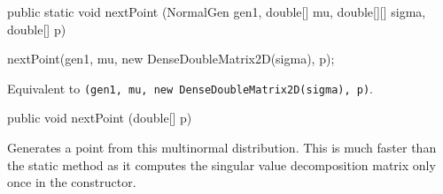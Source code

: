 \begin{code}

   public static void nextPoint (NormalGen gen1, double[] mu,
                                 double[][] sigma, double[] p)\begin{hide} {
      nextPoint(gen1, mu, new DenseDoubleMatrix2D(sigma), p);
   }\end{hide}
\end{code}
\begin{tabb}   Equivalent to
 \texttt{(gen1, mu, new DenseDoubleMatrix2D(sigma), p)}.
\end{tabb}
\begin{code}

   public void nextPoint (double[] p)\begin{hide} {
      int n = mu.length;
      for (int i = 0; i < n; i++) {
         temp[i] = gen1.nextDouble();
         if (temp[i] == Double.NEGATIVE_INFINITY)
            temp[i] = -MYINF;
         if (temp[i] == Double.POSITIVE_INFINITY)
            temp[i] = MYINF;
      }
      for (int i = 0; i < n; i++) {
         p[i] = 0;
         for (int c = 0; c < n; c++)
            p[i] += sqrtSigma.getQuick (i, c)*temp[c];
         p[i] += mu[i];
      }
   }
}\end{hide}
\end{code}
\begin{tabb} Generates a point from this multinormal distribution. This is much
faster than the static method as it computes the singular value decomposition
matrix only once in the constructor.
\end{tabb}
\begin{htmlonly}
\end{htmlonly}
